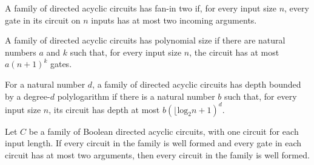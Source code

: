 \begin{definition}
\label{BoolCircuit.DAGCircuitFamily.HasFaninTwo}
\leanok
{}
A family of directed acyclic circuits has fan-in two if, for every input size $n$, every
gate in its circuit on $n$ inputs has at most two incoming arguments.
\end{definition}

\begin{definition}
\label{BoolCircuit.DAGCircuitFamily.IsPolySize}
\leanok
{}
A family of directed acyclic circuits has polynomial size if there are natural numbers
$a$ and $k$ such that, for every input size $n$, the circuit has at most $a(n+1)^k$
gates.
\end{definition}

\begin{definition}
\label{BoolCircuit.DAGCircuitFamily.HasPolylogDepth}
\leanok
{}
For a natural number $d$, a family of directed acyclic circuits has depth bounded by a
degree-$d$ polylogarithm if there is a natural number $b$ such that, for every input
size $n$, its circuit has depth at most $b(\lfloor{\text{log}_2 n}+1)^d$.
\end{definition}

\begin{theorem}
\label{BoolCircuit.DAGCircuitFamily.HasFaninTwo.isWellFormed}
\leanok
{}
Let $C$ be a family of Boolean directed acyclic circuits, with one circuit for each
input length. If every circuit in the family is well formed and every gate in each
circuit has at most two arguments, then every circuit in the family is well formed.
\end{theorem}
